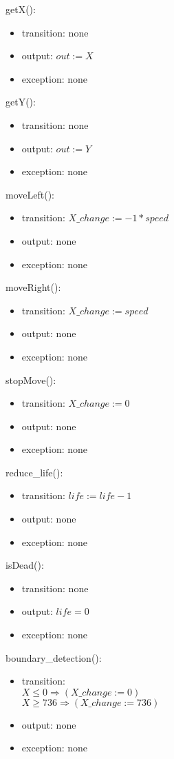 \documentclass[12pt]{article}
\begin{document}
\noindent getX():
\begin{itemize}
\item transition: none
\item output: $out := X$
\item exception: none
\end{itemize}

\noindent getY():
\begin{itemize}
\item transition: none
\item output: $out := Y$
\item exception: none
\end{itemize}

\noindent moveLeft():
\begin{itemize}
\item transition: $X\_change := -1 * speed$
\item output: none
\item exception: none
\end{itemize}

\noindent moveRight():
\begin{itemize}
\item transition: $X\_change := speed$
\item output: none
\item exception: none
\end{itemize}

\noindent stopMove():
\begin{itemize}
\item transition: $X\_change := 0$
\item output: none
\item exception: none
\end{itemize}

\noindent reduce\_life():
\begin{itemize}
\item transition: $life := life - 1$
\item output: none
\item exception: none
\end{itemize}

\noindent isDead():
\begin{itemize}
\item transition: none
\item output: $life = 0$
\item exception: none
\end{itemize}

\noindent boundary\_detection():
\begin{itemize}
\item transition: \\
$X \leq 0 \Rightarrow (X\_change := 0)$\\
$X \geq 736 \Rightarrow (X\_change  := 736)$
\item output: none
\item exception: none
\end{itemize}
\end{document}
